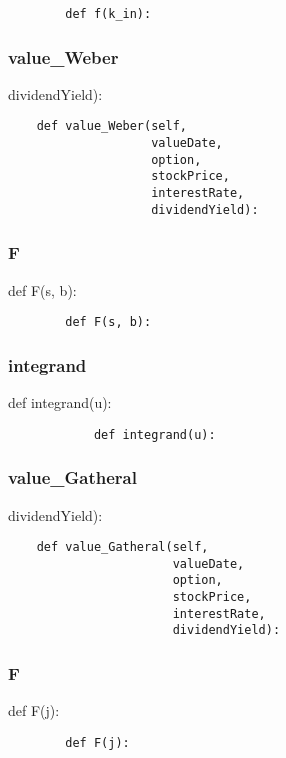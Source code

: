 \documentclass[twoside,11pt]{book}
\begin{document}
\begin{lstlisting}
        def f(k_in):
\end{lstlisting}

\subsubsection*{{\bf value\_Weber}}
dividendYield): 

\begin{lstlisting}
    def value_Weber(self,
                    valueDate,
                    option,
                    stockPrice,
                    interestRate,
                    dividendYield):
\end{lstlisting}

\subsubsection*{{\bf F}}
def F(s, b): 

\begin{lstlisting}
        def F(s, b):
\end{lstlisting}

\subsubsection*{{\bf integrand}}
def integrand(u): 

\begin{lstlisting}
            def integrand(u):
\end{lstlisting}

\subsubsection*{{\bf value\_Gatheral}}
dividendYield): 

\begin{lstlisting}
    def value_Gatheral(self,
                       valueDate,
                       option,
                       stockPrice,
                       interestRate,
                       dividendYield):
\end{lstlisting}

\subsubsection*{{\bf F}}
def F(j): 

\begin{lstlisting}
        def F(j):
\end{lstlisting}
\end{document}
